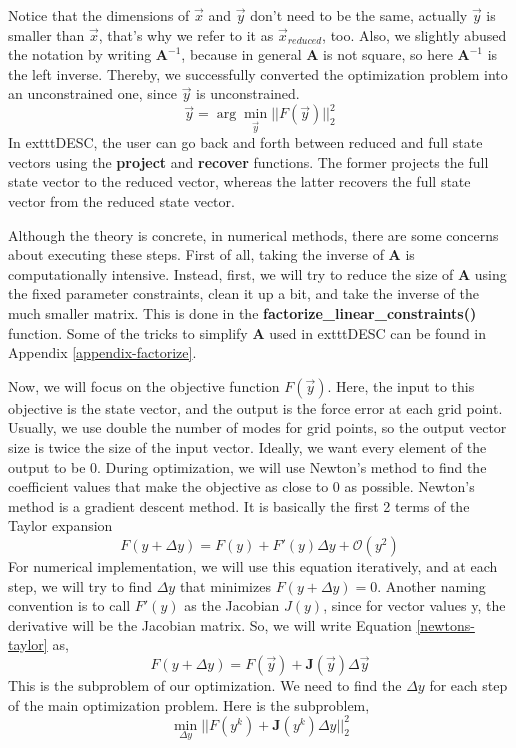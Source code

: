 Notice that the dimensions of $\Vec{x}$ and $\Vec{y}$ don't need to be the same, actually $\Vec{y}$ is smaller than $\Vec{x}$, that's why we refer to it as $\Vec{x}_{reduced}$, too. Also, we slightly abused the notation by writing $\mathbf{A}^{-1}$, because in general $\mathbf{A}$ is not square, so here $\mathbf{A}^{-1}$ is the left inverse. Thereby, we successfully converted the optimization problem into an unconstrained one, since $\Vec{y}$ is unconstrained.
\begin{equation}
    \Vec{y} = \arg \min_{\Vec{y}} ||F(\Vec{y})||^2_2
\end{equation}
In 	exttt{DESC}, the user can go back and forth between reduced and full state vectors using the \textbf{project} and \textbf{recover} functions. The former projects the full state vector to the reduced vector, whereas the latter recovers the full state vector from the reduced state vector.

Although the theory is concrete, in numerical methods, there are some concerns about executing these steps. First of all, taking the inverse of \textbf{A} is computationally intensive. Instead, first, we will try to reduce the size of \textbf{A} using the fixed parameter constraints, clean it up a bit, and take the inverse of the much smaller matrix. This is done in the \textbf{factorize\_linear\_constraints()} function. Some of the tricks to simplify \textbf{A} used in 	exttt{DESC} can be found in Appendix \ref{appendix-factorize}.

Now, we will focus on the objective function $F(\Vec{y})$. Here, the input to this objective is the state vector, and the output is the force error at each grid point. Usually, we use double the number of modes for grid points, so the output vector size is twice the size of the input vector. Ideally, we want every element of the output to be 0. During optimization, we will use Newton's method to find the coefficient values that make the objective as close to 0 as possible. Newton's method is a gradient descent method. It is basically the first 2 terms of the Taylor expansion
\begin{equation}
    F(y+\Delta y) = F(y) + F'(y)\Delta y + \mathcal{O}(y^2) \label{newtons-taylor}
\end{equation}
For numerical implementation, we will use this equation iteratively, and at each step, we will try to find $\Delta y$ that minimizes $F(y+\Delta y)=0$. Another naming convention is to call $F'(y)$ as the Jacobian $J(y)$, since for vector values y, the derivative will be the Jacobian matrix. So, we will write Equation \ref{newtons-taylor} as,
\begin{equation*}
    F(y+\Delta y) = F(\Vec{y}) + \mathbf{J}(\Vec{y})\Delta \Vec{y}
\end{equation*}
This is the subproblem of our optimization. We need to find the $\Delta y$ for each step of the main optimization problem. Here is the subproblem,
\begin{equation}
    \min_{\Delta y} ||F(y^k)  + \mathbf{J}(y^k) \Delta y||^2_2
\end{equation}

